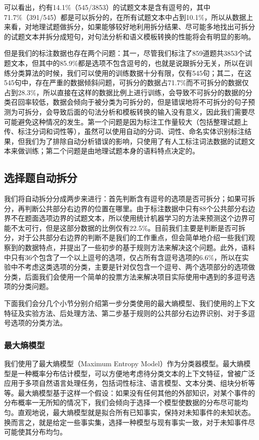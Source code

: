 \documentclass[master, winfont]{njuthesis}
\begin{document}
可以看出，约有14.1\%（545/3853）的试题文本是含有逗号的，其中71.7\%（391/545）都是可以拆分的，在所有试题文本中占到10.1\%，所以从数据上来看，对地理试题做拆分，如果能够较好地利用拆分结果、尽可能多地找出可拆分的试题文本并拆分成短句，对句法分析和语义模板转换的性能将会有明显的影响。

但是我们的标注数据也存在两个问题：其一，尽管我们标注了859道题共3853个试题文本，但其中的85.9\%都是选项不包含逗号的，也就是说跟拆分无关，所以在训练分类算法的时候，我们可以使用的训练数据十分有限，仅有545句；其二，在这545句中，存在严重的数据倾斜问题，可拆分的数据占71.7\%而不可拆分的数据仅占到28.3\%，所以直接在这样的数据比例上进行训练，会导致不可拆分的数据的分类召回率较低，数据会倾向于被分类为可拆分的，但是错误地将不可拆分的句子预测为可拆分，会导致后面的句法分析和模板转换的输入没有意义，因此我们需要尽可能避免这种情况的发生。第一个问题是因为标注工作量较大（包括整理试题上传、标注分词和词性等），虽然可以使用自动的分词、词性、命名实体识别标注结果，但我们为了排除自动分析错误的影响，只使用了有人工标注词法数据的试题文本来做训练；第二个问题是由地理试题本身的语料特点决定的。


\subsection{选择题自动拆分}
我们将自动拆分分成两步来进行：首先判断含有逗号的选项是否可拆分；如果可拆分，再判断公共部分右边界的位置在哪里。由于标注数据中只有88个公共部分右边界不在题面选项边界的试题文本，所以使用统计机器学习的方法来预测这个边界可能不太可行，但是这部分数据的比例仅有22.5\%。目前我们主要是判断是否可拆分，对于公共部分右边界的判断不是我们的工作重点，但会简单地介绍一些我们观察到的数据特点，并提出了一些初步的基于规则方法来解决这个问题。此外，语料中只有36个包含了一个以上逗号的选项，仅占所有含逗号选项的6.6\%，所以在实验中不考虑这类选项的分类，主要是针对仅包含一个逗号、两个选项部分的选项做分类，后面我们会使用一个简单的投票方法来解决项目实际使用中遇到的多逗号选项的分类问题。

下面我们会分几个小节分别介绍第一步分类使用的最大熵模型、我们使用的上下文特征及实验方法、后处理方法、第二步基于规则的公共部分右边界识别、对于多逗号选项的分类方法。

\subsubsection{最大熵模型}
我们使用了最大熵模型（Maximum Entropy Model）\cite{MaxEnt1996}作为分类器模型。最大熵模型是一种概率分布估计模型，可以方便地考虑待分类文本的上下文特征，曾被广泛应用于多项自然语言处理任务，包括词性标注\cite{Ratnaparkhi1996A}、语言模型\cite{Lau1993Adaptive}、文本分类\cite{Nigam1999Using}\cite{TextMaxEnt2005}、组块分析\cite{ChunkMaxEnt2003}等等。最大熵模型基于这样一个假设：如果没有任何其他的外部知识，对某个事件的分布概率一无所知的情况下，我们会倾向于选择一个模型使数据的分布尽可能均匀。直观地说，最大熵模型就是拟合所有已知事实，保持对未知事件的未知状态。换而言之，就是给定一些事实集，选择一种模型与现有事实一致，对于未知事件尽可能使其分布均匀。
\end{document}
